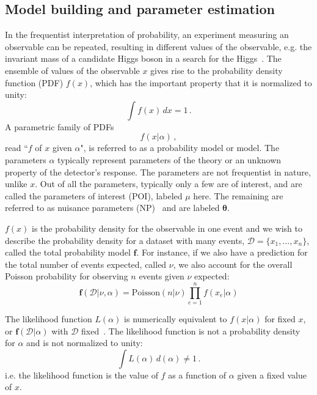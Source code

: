 \subsection{Model building and parameter estimation}
In the frequentist interpretation of probability, an experiment measuring an observable can be repeated, resulting in different values of the observable, e.g. the invariant mass of a candidate Higgs boson in a search for the Higgs~\cite{2011-Statistics-Cranmer}. The ensemble of values of the observable $x$ gives rise to the probability density function (PDF) $f(x)$, which has the important property that it is normalized to unity:
\begin{equation*}
    \int f(x) \, dx = 1 \,.
\end{equation*}
A parametric family of PDFs
\begin{equation*}
    f(x|\alpha) \, ,
\end{equation*}
read ``$f$ of $x$ given $\alpha$", is referred to as a probability model or model. The parameters $\alpha$ typically represent parameters of the theory or an unknown property of the detector's response. The parameters are not frequentist in nature, unlike $x$. Out of all the parameters, typically only a few are of interest, and are called the parameters of interest (POI), labeled $\mu$ here. The remaining are referred to as nuisance parameters (NP)~\cite{2011-Statistics-Cranmer} and are labeled $\boldsymbol{\theta}$.

$f(x)$ is the probability density for the observable in one event and we wish to describe the probability density for a dataset with many events, $\mathcal{D} = \{x_1, ..., x_n\}$, called the total probability model $\boldsymbol{f}$. For instance, if we also have a prediction for the total number of events expected, called $\nu$, we also account for the overall Poisson probability for observing $n$ events given $\nu$ expected:
\begin{equation}
    \boldsymbol{f}(\mathcal{D}|\nu, \alpha) = \text{Poisson}(n|\nu) \prod_{e=1}^{n} f(x_e | \alpha)
\end{equation}

The likelihood function $L(\alpha)$ is numerically equivalent to $f(x|\alpha)$ for fixed $x$, or $\boldsymbol{f}(\mathcal{D}|\alpha)$ with $\mathcal{D}$ fixed~\cite{2011-Statistics-Cranmer}. The likelihood function is not a probability density for $\alpha$ and is not normalized to unity:
\begin{equation*}
    \int L(\alpha) \, d(\alpha) \neq 1 \, .
\end{equation*}
i.e. the likelihood function is the value of $f$ as a function of $\alpha$ given a fixed value of $x$.

